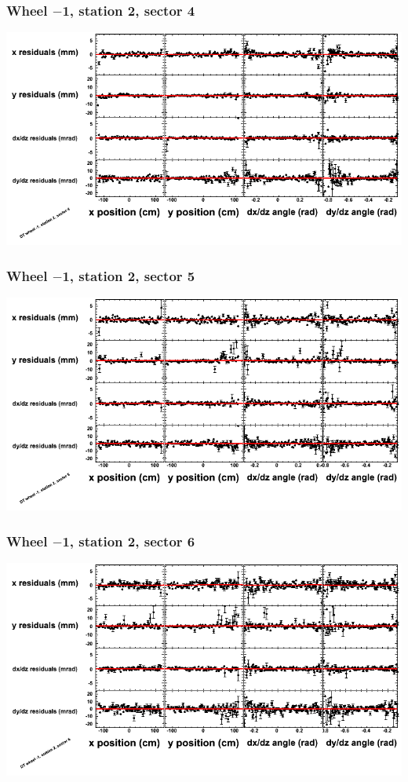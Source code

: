 \documentclass[compress]{beamer}
\begin{document}
\begin{frame}
\frametitle{Wheel $-$1, station 2, sector 4}
\includegraphics[width=\linewidth]{tmppoly_MBwhBst2sec04.png}
\end{frame}

\begin{frame}
\frametitle{Wheel $-$1, station 2, sector 5}
\includegraphics[width=\linewidth]{tmppoly_MBwhBst2sec05.png}
\end{frame}

\begin{frame}
\frametitle{Wheel $-$1, station 2, sector 6}
\includegraphics[width=\linewidth]{tmppoly_MBwhBst2sec06.png}
\end{frame}
\end{document}
